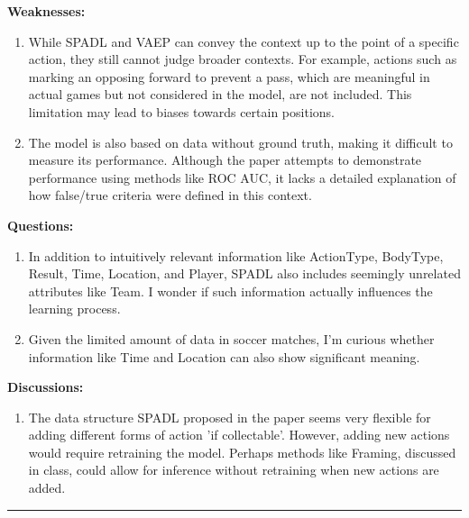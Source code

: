 \documentclass[12pt]{exam}
\begin{document}
\textbf{Weaknesses:} 
\begin{enumerate}
  \item While SPADL and VAEP can convey the context up to the point of a specific action, they still cannot judge broader contexts. For example, actions such as marking an opposing forward to prevent a pass, which are meaningful in actual games but not considered in the model, are not included. This limitation may lead to biases towards certain positions.

  \item The model is also based on data without ground truth, making it difficult to measure its performance. Although the paper attempts to demonstrate performance using methods like ROC AUC, it lacks a detailed explanation of how false/true criteria were defined in this context.
  
\end{enumerate}

\textbf{Questions:} 
\begin{enumerate}
    \item In addition to intuitively relevant information like ActionType, BodyType, Result, Time, Location, and Player, SPADL also includes seemingly unrelated attributes like Team. I wonder if such information actually influences the learning process. 
    \item Given the limited amount of data in soccer matches, I'm curious whether information like Time and Location can also show significant meaning.
\end{enumerate}

\textbf{Discussions:} 
\begin{enumerate}
  \item  The data structure SPADL proposed in the paper seems very flexible for adding different forms of action 'if collectable'. However, adding new actions would require retraining the model. Perhaps methods like Framing, discussed in class, could allow for inference without retraining when new actions are added.
\end{enumerate}


\vspace{5mm}
\rule[1ex]{\textwidth}{1pt}
\end{document}
